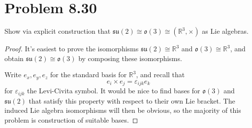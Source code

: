 \documentclass[11pt, letterpaper]{article}
\begin{document}
\section{Problem 8.30}
\begin{problem}
	Show via explicit construction that $\mathfrak{su} (2)\cong \mathfrak{o} (3)\cong (\mathbb{R}^3 ,\times)$ as Lie algebras.
\end{problem}
\begin{proof}
	It's easiest to prove the isomorphisms $\mathfrak{su} (2) \cong \mathbb{R} ^3$ and $\mathfrak{o} (3)\cong \mathbb{R} ^3$, and obtain $\mathfrak{su} (2) \cong \mathfrak{o} (3)$ by composing these isomorphisms.

	Write $e_x,e_y,e_z$ for the standard basis for $\mathbb{R} ^3$, and recall that
	\[
		e_i\times e_j = \varepsilon _{ijk} e_k
	\]
	for $\varepsilon_{ijk} $ the Levi-Civita symbol. It would be nice to find bases for $\mathfrak{o} (3)$ and $\mathfrak{su} (2)$ that satisfy this property with respect to their own Lie bracket. The induced Lie algebra isomorphisms will then be obvious, so the majority of this problem is construction of suitable bases.


\end{proof}
\end{document}
